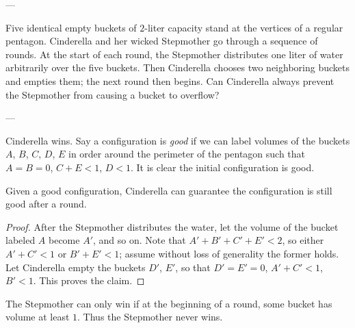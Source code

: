
---

Five identical empty buckets of $2$-liter capacity stand at the vertices of a regular pentagon. Cinderella and her wicked Stepmother go through a sequence of rounds. At the start of each round, the Stepmother distributes one liter of water arbitrarily over the five buckets. Then Cinderella chooses two neighboring buckets and empties them; the next round then begins. Can Cinderella always prevent the Stepmother from causing a bucket to overflow?

---

Cinderella wins. Say a configuration is \emph{good} if we can label volumes of the buckets $A$, $B$, $C$, $D$, $E$ in order around the perimeter of the pentagon such that $A=B=0$, $C+E<1$, $D<1$. It is clear the initial configuration is good.
\begin{iclaim*}
Given a good configuration, Cinderella can guarantee the configuration is still good after a round.
\end{iclaim*}
\begin{proof}
    After the Stepmother distributes the water, let the volume of the bucket labeled $A$ become $A'$, and so on. Note that $A'+B'+C'+E'<2$, so either $A'+C'<1$ or $B'+E'<1$; assume without loss of generality the former holds. Let Cinderella empty the buckets $D'$, $E'$, so that $D'=E'=0$, $A'+C'<1$, $B'<1$. This proves the claim.
\end{proof}

The Stepmother can only win if at the beginning of a round, some bucket has volume at least $1$. Thus the Stepmother never wins.


